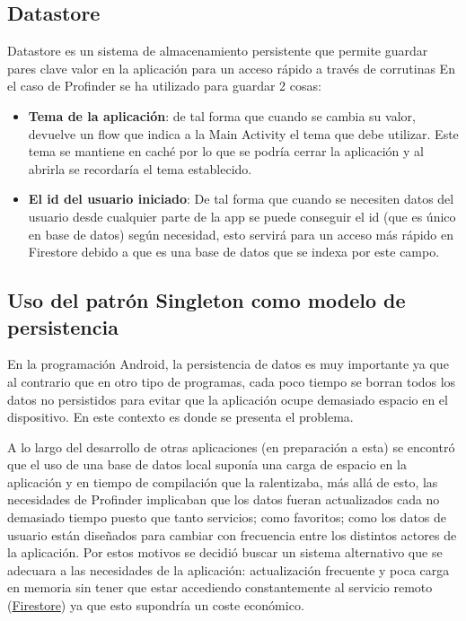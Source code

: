 \subsection{Datastore}
Datastore\hyperlink{cap:biblio}{} es un sistema de almacenamiento persistente que permite guardar pares clave valor en la aplicación para un acceso rápido a través de 
corrutinas\hyperlink{cap:biblio}{} En el caso de Profinder se ha utilizado para guardar 2 cosas:
\begin{itemize}
    \item \textbf{Tema de la aplicación}: de tal forma que cuando se cambia su valor, devuelve un flow\hyperlink{cap:biblio}{} que indica a la Main Activity el tema que debe utilizar. Este tema se mantiene en caché por lo que se podría cerrar la aplicación y al abrirla se recordaría el tema establecido.
    \item \textbf{El id del usuario iniciado}: De tal forma que cuando se necesiten datos del usuario desde cualquier parte de la app se puede conseguir el id (que es único en base de datos) según necesidad, esto servirá para un acceso más rápido en Firestore debido a que es una base de datos que se indexa por este campo.
\end{itemize}

\subsection{Uso del patrón Singleton como modelo de persistencia}
\label{subsec:singletonComoModelo}
En la programación Android, la persistencia de datos es muy importante ya que al contrario que en otro tipo de programas, cada poco tiempo se borran todos los datos no persistidos para evitar que la aplicación ocupe demasiado espacio en el dispositivo. En este contexto es donde se presenta el problema.

A lo largo del desarrollo de otras aplicaciones (en preparación a esta) se encontró que el uso de una base de datos local suponía una carga de espacio en la aplicación y en tiempo de compilación que la ralentizaba, más allá de esto, las necesidades de Profinder implicaban que los datos fueran actualizados cada no demasiado tiempo puesto que tanto servicios; como favoritos; como los datos de usuario están diseñados para cambiar con frecuencia entre los distintos actores de la aplicación. Por estos motivos se decidió buscar un sistema alternativo que se adecuara a las necesidades de la aplicación: actualización frecuente y poca carga en memoria sin tener que estar accediendo constantemente al servicio remoto (\hyperlink{subsec:firestore}{Firestore}) ya que esto supondría un coste económico.

